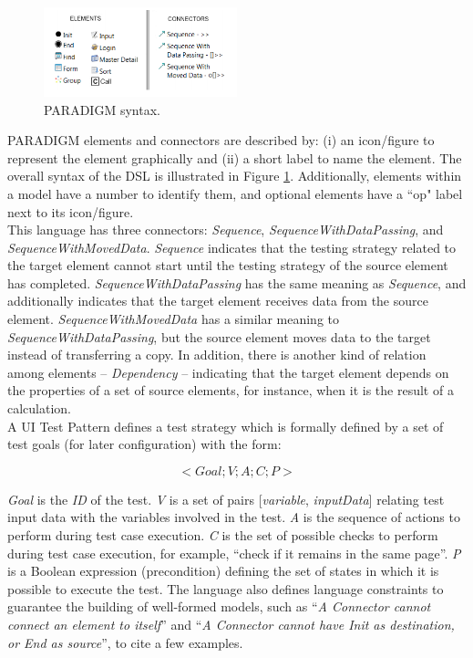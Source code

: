 \documentclass[conference]{IEEEtran}
\begin{document}
\begin{figure}[!htb]
\centering
\includegraphics[width=0.5\textwidth]{dsl1}
\caption{PARADIGM syntax.}
\label{fig:dsl1}
\end{figure}

PARADIGM elements and connectors are described by: (i) an icon/figure to represent the element graphically and (ii) a short label to name the element. The overall syntax of the DSL is illustrated in Figure \ref{fig:dsl1}. Additionally, elements within a model have a number to identify them, and optional elements have a ``op" label next to its icon/figure.\\

This language has three connectors: \textit{Sequence}, \textit{SequenceWithDataPassing}, and \textit{SequenceWithMovedData}. \textit{Sequence} indicates that the testing strategy related to the target element cannot start until the testing strategy of the source element has completed. \textit{SequenceWithDataPassing} has the same meaning as \textit{Sequence}, and additionally indicates that the target element receives data from the source element. \textit{SequenceWithMovedData} has a similar meaning to \textit{SequenceWithDataPassing}, but the source element moves data to the target instead of transferring a copy. In addition, there is another kind of relation among elements -- \textit{Dependency} -- indicating that the target element depends on the properties of a set of source elements, for instance, when it is the result of a calculation. \\

A UI Test Pattern defines a test strategy which is formally defined by a set of test goals (for later configuration)\cite{moreira2013pattern} with the form:

\begin{equation}< Goal; V; A; C; P >\end{equation}\label{eq:ui_}

\textit{Goal} is the \textit{ID} of the test. \textit{V} is a set of pairs { [\textit{variable}, \textit{inputData}] } relating test input data with the variables involved in the test. \textit{A} is the sequence of actions to perform during test case execution. \textit{C} is the set of possible checks to perform during test case execution, for example, “check if it remains in the same page”. \textit{P} is a Boolean expression (precondition) defining the set of states in which it is possible to execute the test. The language also defines language constraints to guarantee the building of well-formed models, such as ``\textit{A Connector cannot connect an element to itself}'' and ``\textit{A Connector cannot have Init as destination, or End as source}'', to cite a few examples.\\
\end{document}
